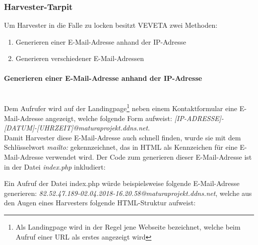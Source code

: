 \subsubsection{Harvester-Tarpit}
Um Harvester in die Falle zu locken besitzt VEVETA zwei Methoden:
\begin{enumerate}
	\item Generieren einer E-Mail-Adresse anhand der IP-Adresse
	\item Generieren verschiedener E-Mail-Adressen
\end{enumerate}
\paragraph{Generieren einer E-Mail-Adresse anhand der IP-Adresse}\mbox{}\\
Dem Aufrufer wird auf der Landingpage\footnote{Als Landingpage wird in der Regel jene Webseite bezeichnet, welche beim Aufruf einer URL als erstes angezeigt wird} neben einem Kontaktformular eine E-Mail-Adresse angezeigt, welche folgende Form aufweist: \emph{[IP-ADRESSE]-[DATUM]-[UHRZEIT]@maturaprojekt.ddns.net}.\\
Damit Harvester diese E-Mail-Adresse auch schnell finden, wurde sie mit dem Schlüsselwort \emph{mailto:} gekennzeichnet, das in HTML als Kennzeichen für eine E-Mail-Adresse verwendet wird. Der Code zum generieren dieser E-Mail-Adresse ist in der Datei \emph{index.php} inkludiert:

Ein Aufruf der Datei index.php würde beispielsweise folgende E-Mail-Adresse generieren:
\emph{82.52.47.189-02.04.2018-16.20.58@maturaprojekt.ddns.net}, welche aus den Augen eines Harvesters folgende HTML-Struktur aufweist:\\

